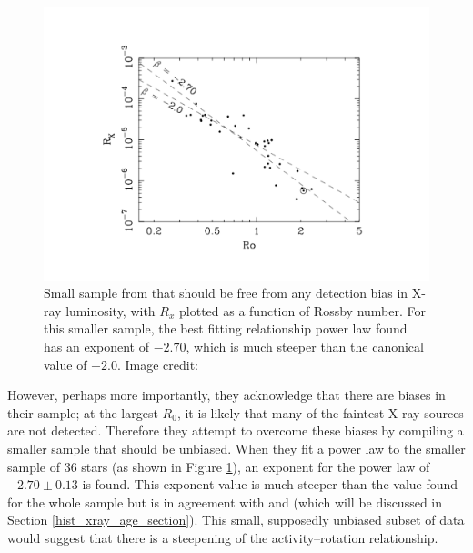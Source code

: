 \begin{figure}[h]
    \centering
    \includegraphics[scale=0.55]{Figures/2-Historical_overview/wright_etal_fig_3.pdf}
    \caption[Activity--rotation relationship for small, unbiased subset of \citet{Wright_etal_2011} data]{Small sample from \citet{Wright_etal_2011} that should be free from any detection bias in X-ray luminosity, with $R_{x}$ plotted as a function of Rossby number. For this smaller sample, the best fitting relationship power law found has an exponent of $-2.70$, which is much steeper than the canonical value of $-2.0$. Image credit: \citet{Wright_etal_2011}}
    \label{fig:wright_etal_2011_plot}
\end{figure}

However, perhaps more importantly, they acknowledge that there are biases in their sample; at the largest $R_{0}$, it is likely that many of the faintest X-ray sources are not detected. Therefore they attempt to overcome these biases by compiling a smaller sample that should be unbiased. When they fit a power law to the smaller sample of 36 stars (as shown in Figure \ref{fig:wright_etal_2011_plot}), an exponent for the power law of $-2.70 \pm 0.13$ is found. This exponent value is much steeper than the value found for the whole sample but is in agreement with \citet{Gudel_etal_1997} and \citet{Feigelson_etal_2004} (which will be discussed in Section \ref{hist_xray_age_section}). This small, supposedly unbiased subset of data would suggest that there is a steepening of the activity--rotation relationship.

